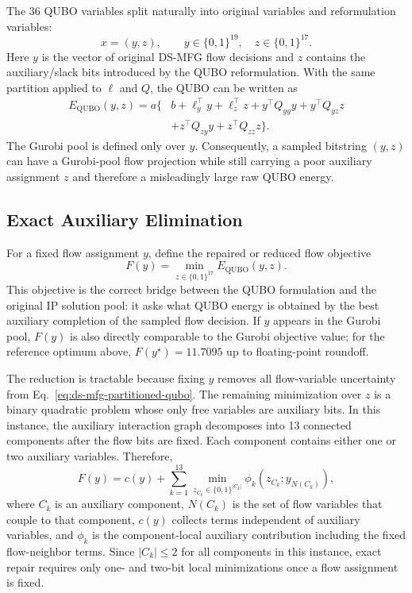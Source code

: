 The 36 QUBO variables split naturally into original variables and reformulation
variables:
\[
    x = (y,z), \qquad
    y \in \{0,1\}^{19}, \quad z \in \{0,1\}^{17}.
\]
Here $y$ is the vector of original DS-MFG flow decisions and $z$ contains the
auxiliary/slack bits introduced by the QUBO reformulation. With the same
partition applied to $\ell$ and $Q$, the QUBO can be written as
\begin{equation}
\begin{aligned}
    E_{\mathrm{QUBO}}(y,z)
    = a\{&
        b + \ell_y^\top y + \ell_z^\top z
        + y^\top Q_{yy}y + y^\top Q_{yz}z \\
        &+ z^\top Q_{zy}y + z^\top Q_{zz}z
    \}.
\end{aligned}
\label{eq:ds-mfg-partitioned-qubo}
\end{equation}
The Gurobi pool is defined only over $y$. Consequently, a sampled bitstring
$(y,z)$ can have a Gurobi-pool flow projection while still carrying a poor
auxiliary assignment $z$ and therefore a misleadingly large raw QUBO energy.

\subsection{Exact Auxiliary Elimination}
\label{subsec:ds-mfg-auxiliary-elimination}

For a fixed flow assignment $y$, define the repaired or reduced flow objective
\begin{equation}
    F(y)
    =
    \min_{z \in \{0,1\}^{17}} E_{\mathrm{QUBO}}(y,z).
    \label{eq:ds-mfg-repaired-objective}
\end{equation}
This objective is the correct bridge between the QUBO formulation and the
original IP solution pool: it asks what QUBO energy is obtained by the best
auxiliary completion of the sampled flow decision. If $y$ appears in the Gurobi
pool, $F(y)$ is also directly comparable to the Gurobi objective value; for the
reference optimum above, $F(y^\star)=11.7095$ up to floating-point roundoff.

The reduction is tractable because fixing $y$ removes all flow-variable
uncertainty from Eq.~\eqref{eq:ds-mfg-partitioned-qubo}. The remaining
minimization over $z$ is a binary quadratic problem whose only free variables
are auxiliary bits. In this instance, the auxiliary interaction graph
decomposes into 13 connected components after the flow bits are fixed. Each
component contains either one or two auxiliary variables. Therefore,
\begin{equation}
    F(y)
    =
    c(y) + \sum_{k=1}^{13}
    \min_{z_{C_k} \in \{0,1\}^{|C_k|}}
    \phi_k\!\left(z_{C_k}; y_{N(C_k)}\right),
    \label{eq:ds-mfg-component-repair}
\end{equation}
where $C_k$ is an auxiliary component, $N(C_k)$ is the set of flow variables
that couple to that component, $c(y)$ collects terms independent of auxiliary
variables, and $\phi_k$ is the component-local auxiliary contribution including
the fixed flow-neighbor terms. Since $|C_k| \le 2$ for all components in this
instance, exact repair requires only one- and two-bit local minimizations once a
flow assignment is fixed.

